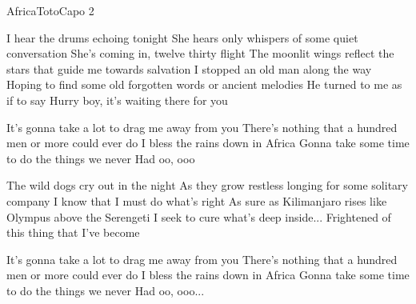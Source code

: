 \begin{song}{Africa}{Toto}{Capo 2}


I hear the drums echoing tonight
She hears only whispers of some quiet conversation
She's coming in, twelve thirty flight
The moonlit wings reflect the stars that guide me towards salvation
I stopped an old man along the way
Hoping to find some old forgotten words or ancient melodies
He turned to me as if to say
Hurry boy, it's waiting there for you

It's gonna take a lot to drag me away from you
There's nothing that a hundred men or more could ever do
I bless the rains down in Africa
Gonna take some time to do the things we never
Had                oo, ooo


The wild dogs cry out in the night
As they grow restless longing for some solitary company
I know that I must do what's right
As sure as Kilimanjaro rises like Olympus above the Serengeti
I seek to cure what's deep inside...
Frightened of this thing that I've become

It's gonna take a lot to drag me away from you
There's nothing that a hundred men or more could ever do
I bless the rains down in Africa
Gonna take some time to do the things we never
Had                oo, ooo...


\end{song}
